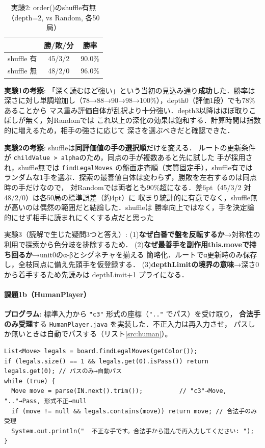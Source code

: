 \documentclass[11pt,a4j]{ujarticle} %
\begin{document}
\begin{table}[h]\center
\caption{実験2: order()のshuffle有無（depth=2, vs Random, 各50局）}\label{tab:1b}
\begin{tabular}{c|c|c}
 & 勝/敗/分 & 勝率 \\ \hline\hline
shuffle 有 & 45/3/2 & 90.0\% \\
shuffle 無 & 48/2/0 & 96.0\% \\
\end{tabular}
\end{table}

\textbf{実験1の考察}: 「深く読むほど強い」という当初の見込み通り\textbf{成功}した．勝率は
深さに対し単調増加し（78→88→90→98→100\%），depth0（評価1段）でも78\%あることから
マス重み評価自体が乱択より十分強い．depth3以降はほぼ取りこぼしが無く，対Randomでは
これ以上の深化の効果は飽和する．計算時間は指数的に増えるため，相手の強さに応じて
深さを選ぶべきだと確認できた．

\textbf{実験2の考察}: shuffleは\textbf{同評価値の手の選択順}だけを変える．
ルートの更新条件が {\verb+childValue > alpha+}のため，同点の手が複数あると先に試した
手が採用され，shuffle無では {\verb+findLegalMoves+} の盤面走査順（実質固定手），shuffle有では
ランダムな1手を選ぶ．探索の最善値自体は変わらず，勝敗を左右するのは同点時の手だけなので，
対Randomでは両者とも90\%超になる．差6pt（45/3/2 対 48/2/0）は各50局の標準誤差（約4pt）に
収まり統計的に有意でなく，shuffle無が高いのは偶然の範囲だと結論した．shuffleは
勝率向上ではなく，手を決定論的にせず相手に読まれにくくする点だと思った

実験3（読解で生じた疑問3つと答え）:
(1)\textbf{なぜ白番で盤を反転するか}→対称性の利用で探索から色分岐を排除するため．
(2)\textbf{なぜ最善手を副作用this.moveで持ち回るか}→unit0のα-βとシグネチャを揃える
簡略化．ルートでα更新時のみ保存し，全枝同点に備え先頭手を仮登録する．
(3)\textbf{depthLimitの境界の意味}→深さ0から着手するため先読みは depthLimit+1 プライになる．

\paragraph{課題1b（HumanPlayer）}
\textbf{プログラム}: 標準入力から {\verb+"c3"+} 形式の座標（{\verb+".."+} でパス）を受け取り，
\textbf{合法手のみ受理}する {\verb+HumanPlayer.java+} を実装した．不正入力は再入力させ，
パスしか無いときは自動でパスする（リスト\ref{src:human}）。
\begin{lstlisting}[caption=人間の入力を合法手のみ受理する（HumanPlayer\#think）,label=src:human]
List<Move> legals = board.findLegalMoves(getColor());
if (legals.size() == 1 && legals.get(0).isPass()) return legals.get(0); // パスのみ→自動パス
while (true) {
  Move move = parse(IN.next().trim());          // "c3"→Move, ".."→Pass, 形式不正→null
  if (move != null && legals.contains(move)) return move; // 合法手のみ受理
  System.out.println("  不正な手です。合法手から選んで再入力してください: ");
}
\end{lstlisting}
\end{document}
